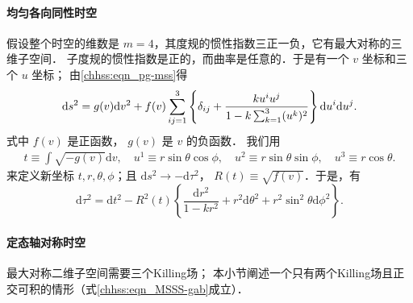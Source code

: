 
\paragraph{均匀各向同性时空}
假设整个时空的维数是 $m=4$，其度规的惯性指数三正一负，它有最大对称的三维子空间．
子度规的惯性指数是正的，而曲率是任意的．于是有一个 $v$ 坐标和三个 $u$ 坐标；
由\eqref{chhss:eqn_pg-mss}得
\begin{equation}\label{chhss:eqn_g-cos}
    \mathrm{d} s^2=g(v) \mathrm{d} v^2  +f(v) \sum_{ij=1}^{3} \left\{\delta_{ij} 
    + \frac{k u^i u^j}{1-k \sum_{k=1}^{3}(u^k)^2}\right\} {\rm d} u^i {\rm d} u^j.
\end{equation}
式中 $f(v)$ 是正函数， $g(v)$ 是 $v$ 的负函数．
我们用
\begin{align*}
    t\equiv\int \sqrt{-g(v)}\mathrm{d} v,\quad
    u^1 \equiv r \sin \theta \cos \phi, \quad
    u^2 \equiv r \sin \theta \sin \phi, \quad
    u^3 \equiv r \cos \theta .
\end{align*}
来定义新坐标 $t, r, \theta, \phi$；且 $\mathrm{d} s^2 \to -\mathrm{d} \tau^2$，
$R(t) \equiv \sqrt{f(v)}$．于是，有
\begin{equation}\label{chhss:eqn_g-cos-2}
    \mathrm{d} \tau^2=\mathrm{d} t^2-R^2(t)\left\{\frac{\mathrm{d} r^2}{1-k r^2}
    +r^2 \mathrm{d} \theta^2+r^2 \sin ^2 \theta \mathrm{d} \phi^2\right\}    .
\end{equation}


\paragraph{定态轴对称时空}\label{chhss:sec_axis-sym}

最大对称二维子空间需要三个Killing场；
本小节阐述一个只有两个Killing场且正交可积的情形（式\eqref{chhss:eqn_MSSS-gab}成立）．

